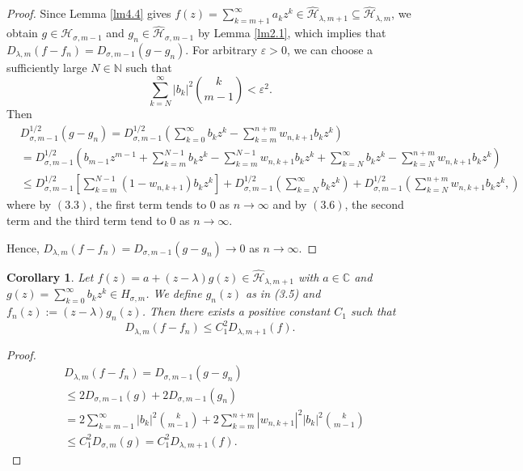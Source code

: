 \documentclass[12pt,reqno]{amsart}
\newtheorem{corollary}[theorem]{Corollary}
\begin{document}
\begin{proof}
Since Lemma \ref{lm4.4} gives $f(z) = \sum\limits_{k = m+1}^{\infty}  a_k z^k \in \widehat{\mathcal{H}}_{\lambda ,m+1} \subseteq \widehat{\mathcal{H}}_{\lambda ,m}$,  we obtain $g \in \mathcal{H}_{\sigma ,m-1}$ and ${g_n} \in \widehat{\mathcal{H}}_{\sigma ,m-1}$ by Lemma \ref{lm2.1}, which implies that ${D_{\lambda ,m}}(f - {f_n}) = {D_{\sigma ,m - 1}}(g - {g_n})$.
For arbitrary $ \varepsilon >0 $, we can choose a sufficiently large $N\in\mathbb{N}$ such that
\begin{equation}
 \sum\limits_{k = N}^\infty  {|{b_k}{|^2}} \binom{k}{m - 1}<{\varepsilon ^2}. \tag{3.6}
 \end{equation}
Then
\begin{align*}
&D_{\sigma ,m - 1}^{1/2}\left( {g - {g_n}} \right) = D_{\sigma ,m - 1}^{1/2}\left( {\sum\limits_{k = 0}^\infty  {{b_k}} {z^k} - \sum\limits_{k = m}^{n + m} {{w_{n,k + 1}}} {b_k}{z^k}} \right)\\
&=D_{\sigma ,m - 1}^{1/2}\left( {{b_{m - 1}}{z^{m - 1}} + \sum\limits_{k = m}^{N - 1} {{b_k}{z^k}}  - \sum\limits_{k = m}^{N - 1} {{w_{n,k + 1}}{b_k}{z^k} + \sum\limits_{k = N}^\infty  {{b_k}{z^k} - \sum\limits_{k = N}^{n + m} {{w_{n,k + 1}}{b_k}{z^k}} } } } \right)\\
& \le D_{\sigma ,m - 1}^{1/2}\left[ {\sum\limits_{k = m}^{N - 1} {(1 - {w_{n,k + 1}}){b_k}{z^k}} } \right] + D_{\sigma ,m - 1}^{1/2}\left( {\sum\limits_{k = N}^\infty  {{b_k}{z^k}} } \right) + D_{\sigma ,m - 1}^{1/2}\left( {\sum\limits_{k = N}^{n + m} {{w_{n,k + 1}}{b_k}{z^k}} }, \right)
\end{align*}
where by \((3.3)\), the first term tends to 0 as $n \to \infty$ and by \((3.6)\), the second term and the third term tend to 0 as $n \to \infty$.

Hence, ${D_{\lambda ,m}}(f - {f_n})={D_{\sigma ,m-1}}(g - {g_n}) \to 0 $ as $n \to \infty$.
\end{proof}

\begin{corollary}\label{co4.6}
Let \( f(z) = a + (z - \lambda)g(z) \in \widehat{\mathcal{H}}_{\lambda, m+1} \) with $ a\in\mathbb{C} $ and $g(z) = \sum\limits_{k = 0}^\infty  {{b_k}{z^k}}  \in H_{\sigma, m} $. We define ${g_n}(z)$ as in (3.5) and ${f_n}(z) := (z - \lambda ){g_n}(z)$. Then there exists a positive constant ${C_1}$ such that
$${D_{\lambda ,m}}(f - {f_n}) \le C_1^2{D_{\lambda ,m+1}}(f).$$
\end{corollary}

\begin{proof}
\begin{align*}
&{D_{\lambda ,m}}\left( {f - {f_n}} \right) = {D_{\sigma ,m - 1}}\left( {g - {g_n}} \right)\\
& \le 2{D_{\sigma ,m - 1}}\left( g \right) + 2{D_{\sigma ,m - 1}}\left( {{g_n}} \right)\\
&= 2\sum\limits_{k = m - 1}^\infty  {{{\left| {{b_k}} \right|}^2}}\binom{k}{m-1} + 2\sum\limits_{k = m}^{n + m} {{{\left| {{w_{n,k + 1}}} \right|}^2}{{\left| {{b_k}} \right|}^2}}\binom{k}{m-1} \\
& \le C_1^2{D_{\sigma ,m}}(g)= C_1^2{D_{\lambda ,m+1}}(f).
\end{align*}
\end{proof}
\end{document}
